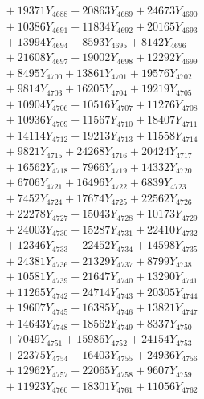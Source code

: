 \documentclass[a4paper,10pt]{article}
\begin{document}
{\begin{align}
&\;  + 19371 Y_{4688} + 20863 Y_{4689} + 24673 Y_{4690} \\[0.3ex]
&\;  + 10386 Y_{4691} + 11834 Y_{4692} + 20165 Y_{4693} \\[0.3ex]
&\;  + 13994 Y_{4694} + 8593 Y_{4695} + 8142 Y_{4696} \\[0.3ex]
&\;  + 21608 Y_{4697} + 19002 Y_{4698} + 12292 Y_{4699} \\[0.3ex]
&\;  + 8495 Y_{4700} + 13861 Y_{4701} + 19576 Y_{4702} \\[0.3ex]
&\;  + 9814 Y_{4703} + 16205 Y_{4704} + 19219 Y_{4705} \\[0.3ex]
&\;  + 10904 Y_{4706} + 10516 Y_{4707} + 11276 Y_{4708} \\[0.5ex]\allowbreak
&\;  + 10936 Y_{4709} + 11567 Y_{4710} + 18407 Y_{4711} \\[0.3ex]
&\;  + 14114 Y_{4712} + 19213 Y_{4713} + 11558 Y_{4714} \\[0.3ex]
&\;  + 9821 Y_{4715} + 24268 Y_{4716} + 20424 Y_{4717} \\[0.3ex]
&\;  + 16562 Y_{4718} + 7966 Y_{4719} + 14332 Y_{4720} \\[0.3ex]
&\;  + 6706 Y_{4721} + 16496 Y_{4722} + 6839 Y_{4723} \\[0.3ex]
&\;  + 7452 Y_{4724} + 17674 Y_{4725} + 22562 Y_{4726} \\[0.3ex]
&\;  + 22278 Y_{4727} + 15043 Y_{4728} + 10173 Y_{4729} \\[0.3ex]
&\;  + 24003 Y_{4730} + 15287 Y_{4731} + 22410 Y_{4732} \\[0.3ex]
&\;  + 12346 Y_{4733} + 22452 Y_{4734} + 14598 Y_{4735} \\[0.3ex]
&\;  + 24381 Y_{4736} + 21329 Y_{4737} + 8799 Y_{4738} \\[0.5ex]\allowbreak
&\;  + 10581 Y_{4739} + 21647 Y_{4740} + 13290 Y_{4741} \\[0.3ex]
&\;  + 11265 Y_{4742} + 24714 Y_{4743} + 20305 Y_{4744} \\[0.3ex]
&\;  + 19607 Y_{4745} + 16385 Y_{4746} + 13821 Y_{4747} \\[0.3ex]
&\;  + 14643 Y_{4748} + 18562 Y_{4749} + 8337 Y_{4750} \\[0.3ex]
&\;  + 7049 Y_{4751} + 15986 Y_{4752} + 24154 Y_{4753} \\[0.3ex]
&\;  + 22375 Y_{4754} + 16403 Y_{4755} + 24936 Y_{4756} \\[0.3ex]
&\;  + 12962 Y_{4757} + 22065 Y_{4758} + 9607 Y_{4759} \\[0.3ex]
&\;  + 11923 Y_{4760} + 18301 Y_{4761} + 11056 Y_{4762} \\[0.3ex]

\end{align}}
\end{document}
